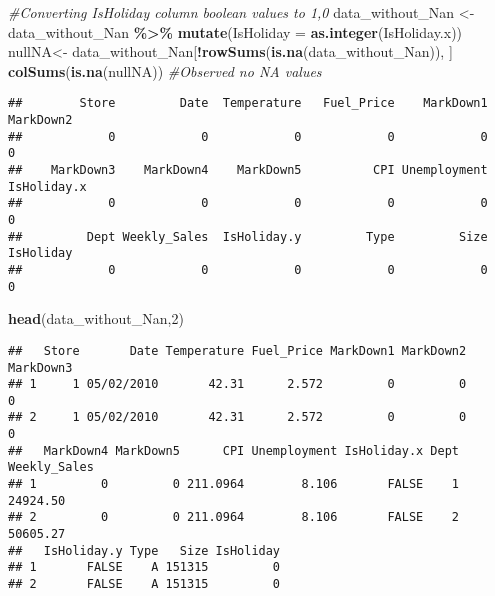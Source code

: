 \documentclass[
]{article}
\newenvironment{Shaded}{\begin{snugshade}}{\end{snugshade}}
\newcommand{\AttributeTok}[1]{\textcolor[rgb]{0.13,0.29,0.53}{#1}}
\newcommand{\CommentTok}[1]{\textcolor[rgb]{0.56,0.35,0.01}{\textit{#1}}}
\newcommand{\DecValTok}[1]{\textcolor[rgb]{0.00,0.00,0.81}{#1}}
\newcommand{\FunctionTok}[1]{\textcolor[rgb]{0.13,0.29,0.53}{\textbf{#1}}}
\newcommand{\NormalTok}[1]{#1}
\newcommand{\OtherTok}[1]{\textcolor[rgb]{0.56,0.35,0.01}{#1}}
\newcommand{\SpecialCharTok}[1]{\textcolor[rgb]{0.81,0.36,0.00}{\textbf{#1}}}
\begin{document}
\begin{Shaded}
\begin{Highlighting}[]
\CommentTok{\#Converting IsHoliday column boolean values to 1,0}
\NormalTok{data\_without\_Nan }\OtherTok{\textless{}{-}}\NormalTok{ data\_without\_Nan }\SpecialCharTok{\%\textgreater{}\%}
  \FunctionTok{mutate}\NormalTok{(}\AttributeTok{IsHoliday =} \FunctionTok{as.integer}\NormalTok{(IsHoliday.x))}
\NormalTok{nullNA}\OtherTok{\textless{}{-}}\NormalTok{ data\_without\_Nan[}\SpecialCharTok{!}\FunctionTok{rowSums}\NormalTok{(}\FunctionTok{is.na}\NormalTok{(data\_without\_Nan)), ]}
\FunctionTok{colSums}\NormalTok{(}\FunctionTok{is.na}\NormalTok{(nullNA)) }\CommentTok{\#Observed no NA values}
\end{Highlighting}
\end{Shaded}

\begin{verbatim}
##        Store         Date  Temperature   Fuel_Price    MarkDown1    MarkDown2 
##            0            0            0            0            0            0 
##    MarkDown3    MarkDown4    MarkDown5          CPI Unemployment  IsHoliday.x 
##            0            0            0            0            0            0 
##         Dept Weekly_Sales  IsHoliday.y         Type         Size    IsHoliday 
##            0            0            0            0            0            0
\end{verbatim}

\begin{Shaded}
\begin{Highlighting}[]
\FunctionTok{head}\NormalTok{(data\_without\_Nan,}\DecValTok{2}\NormalTok{)}
\end{Highlighting}
\end{Shaded}

\begin{verbatim}
##   Store       Date Temperature Fuel_Price MarkDown1 MarkDown2 MarkDown3
## 1     1 05/02/2010       42.31      2.572         0         0         0
## 2     1 05/02/2010       42.31      2.572         0         0         0
##   MarkDown4 MarkDown5      CPI Unemployment IsHoliday.x Dept Weekly_Sales
## 1         0         0 211.0964        8.106       FALSE    1     24924.50
## 2         0         0 211.0964        8.106       FALSE    2     50605.27
##   IsHoliday.y Type   Size IsHoliday
## 1       FALSE    A 151315         0
## 2       FALSE    A 151315         0
\end{verbatim}
\end{document}
